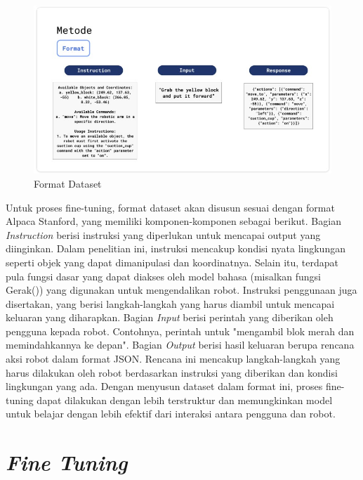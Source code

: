 \begin{figure} [H] \centering
  \includegraphics[scale=0.7]{gambar/format-data.jpg}
  \caption{Format Dataset}
\end{figure}

Untuk proses fine-tuning, format dataset akan disusun sesuai dengan format Alpaca Stanford, yang memiliki komponen-komponen sebagai berikut. Bagian \textit{Instruction} berisi instruksi yang diperlukan untuk mencapai output yang diinginkan. Dalam penelitian ini, instruksi mencakup kondisi nyata lingkungan seperti objek yang dapat dimanipulasi dan koordinatnya. Selain itu, terdapat pula fungsi dasar yang dapat diakses oleh model bahasa (misalkan fungsi Gerak()) yang digunakan untuk mengendalikan robot. Instruksi penggunaan juga disertakan, yang berisi langkah-langkah yang harus diambil untuk mencapai keluaran yang diharapkan. Bagian \textit{Input} berisi perintah yang diberikan oleh pengguna kepada robot. Contohnya, perintah untuk "mengambil blok merah dan memindahkannya ke depan". Bagian \textit{Output} berisi hasil keluaran berupa rencana aksi robot dalam format JSON. Rencana ini mencakup langkah-langkah yang harus dilakukan oleh robot berdasarkan instruksi yang diberikan dan kondisi lingkungan yang ada. Dengan menyusun dataset dalam format ini, proses fine-tuning dapat dilakukan dengan lebih terstruktur dan memungkinkan model untuk belajar dengan lebih efektif dari interaksi antara pengguna dan robot.



\section{\textit{Fine Tuning}}

